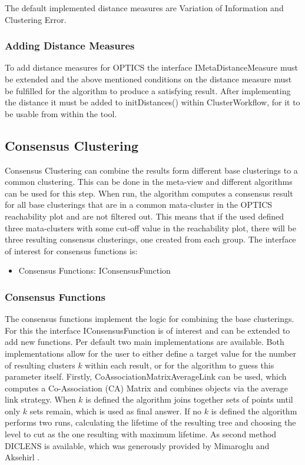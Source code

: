 \documentclass[
	a4paper,
	english,
	twoside,
	openright,               
	11pt                            
	]{report}
\begin{document}
The default implemented distance measures are Variation of Information and Clustering Error. 
\subsubsection*{Adding Distance Measures}
To add distance measures for OPTICS the interface IMetaDistanceMeasure must be extended and the above mentioned conditions on the distance measure must be fulfilled for the algorithm to produce a satisfying result. After implementing the distance it must be added to initDistances() within ClusterWorkflow, for it to be usable from within the tool.

\subsection{Consensus Clustering}
Consensus Clustering can combine the results form different base clusterings to a common clustering. This can be done in the meta-view and different algorithms can be used for this step. When run, the algorithm computes a consensus result for all base clusterings that are in a common mata-cluster in the OPTICS reachability plot and are not filtered out. This means that if the used defined three mata-clusters with some cut-off value in the reachability plot, there will be three resulting consensus clusterings, one created from each group. The interface of interest for consensus functions is:

\begin{itemize}
  \item Consensus Functions: IConsensusFunction
\end{itemize}

\subsubsection{Consensus Functions}
The consensus functions implement the logic for combining the base clusterings. For this the interface IConsensusFunction is of interest and can be extended to add new functions. Per default two main implementations are available. Both implementations allow for the user to either define a target value for the number of resulting clusters $k$ within each result, or for the algorithm to guess this parameter itself. Firstly, CoAssociationMatrixAverageLink can be used, which computes a Co-Association (CA) Matrix and combines objects via the average link strategy. When $k$ is defined the algorithm joins together sets of points until only $k$ sets remain, which is used as final answer. If no $k$ is defined the algorithm performs two runs, calculating the lifetime \cite{lifetime} of the resulting tree and choosing the level to cut as the one resulting with maximum lifetime. As second method DICLENS is available, which was generously provided by Mimaroglu and Aksehirl \cite{DICLENS}.
\end{document}
